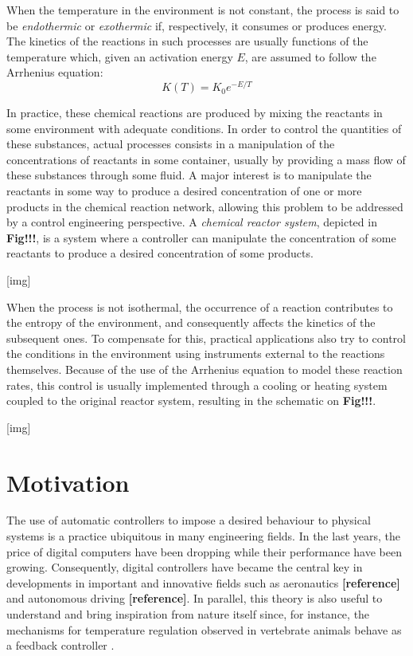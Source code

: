 \documentclass[a4paper,11pt]{book}
\numberwithin{figure}{chapter}
\numberwithin{equation}{chapter}
\numberwithin{table}{chapter}
\theoremstyle{definition}
\begin{document}
When the temperature in the environment is not constant, the process is said to be \textit{endothermic} or \textit{exothermic} if, respectively, it consumes or produces energy. The kinetics of the reactions in such processes are usually functions of the temperature which, given an activation energy $E$, are assumed to follow the Arrhenius equation:
\begin{equation} \label{eq:arrhenius1}
    K(T) = K_0 e^{-E / T}
\end{equation}

In practice, these chemical reactions are produced by mixing the reactants in some environment with adequate conditions. In order to control the quantities of these substances, actual processes consists in a manipulation of the concentrations of reactants in some container, usually by providing a mass flow of these substances through some fluid. A major interest is to manipulate the reactants in some way to produce a desired concentration of one or more products in the chemical reaction network, allowing this problem to be addressed by a control engineering perspective. A \textit{chemical reactor system}, depicted in \textbf{Fig!!!}, is a system where a controller can manipulate the concentration of some reactants to produce a desired concentration of some products.

[img]

When the process is not isothermal, the occurrence of a reaction contributes to the entropy of the environment, and consequently affects the kinetics of the subsequent ones. To compensate for this, practical applications also try to control the conditions in the environment using instruments external to the reactions themselves. Because of the use of the Arrhenius equation to model these reaction rates, this control is usually implemented through a cooling or heating system coupled to the original reactor system, resulting in the schematic on \textbf{Fig!!!}.

[img]

\section{Motivation}

The use of automatic controllers to impose a desired behaviour to physical systems is a practice ubiquitous in many engineering fields. In the last years, the price of digital computers have been dropping while their performance have been growing. Consequently, digital controllers have became the central key in developments in important and innovative fields such as aeronautics \textbf{[reference]} and autonomous driving \textbf{[reference]}. In parallel, this theory is also useful to understand and bring inspiration from nature itself since, for instance, the mechanisms for temperature regulation observed in vertebrate animals behave as a feedback controller \cite{Heller:1978}.
\end{document}
